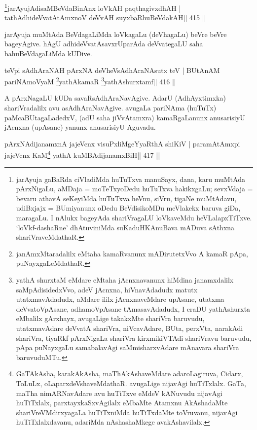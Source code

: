 \begin{shl}
\footnote{jarAyuja gaBaRda ciVladiMda huTuTxva manuSayx, dana, karu muMtAda pArxNigaLu, aMDaja = moTeTxyoDedu huTuTxva hakikxgaLu;  sevxVdaja = bevaru athavA seKeyiMda huTuTxva heVnu, siVru, tigaNe  muMtAdavu, udiBxjajx = BUmiyanunx oDedu BeVdisikoMDu meVlakekx baruva  giDa, maragaLu. I nAlukx bageyAda shariVragaLU loVkaveMdu heVLalapxTiTxve. `loVkf-dashaRne' dhAtuviniMda suKaduHKAnuBava mADuva sAthxna shariVraveMdathaR.}jarAyujAdisaMBeVdaBinAnx loVkAH paqthagivxdhAH |
tathA\s dhideVvatAtAmxnoV deVvAH suyxbaRhuBeVdakAH\hfill || 415 ||
\end{shl}

\begin{artha}
jarAyuja muMtAda BeVdagaLiMda loVkagaLu (deVhagaLu) beVre beVre  bageyAgive. hAgU adhideVvatAsavxrUparAda deVvategaLU saha bahuBeVdagaLiMda kUDive.
\end{artha}

\begin{shl}
teV\s pi sAdhAraNAH pArxNA deVheV\s sAdhAraNAsutx teV |
BUtAnAM pariNAmoV\s yaM \footnote{janAmxMtaradalilx eMtaha kamaRvanunx mADirutetxVvo A  kamaR pApa, puNayxgaLeMdathaR.}yathAkamaR \footnote{yathA shurxtaM eMdare eMtaha jAcnxnavanunx hiMdina  janamxdalilx saMpAdisidedxVvo, adeV jAcnxna, hiVnavAdadudx matutx utatxmavAdadudx, aMdare ililx jAcnxnaveMdare upAsane, utatxma deVvatoVpAsane, adhamoVpAsane tAmasavAdadudx, I eraDU yathAshurxta eMbalilx gArxhayx, avugaLige takakxMte shariVra baruvudu, utatxmavAdare deVvatA shariVra, niVcavAdare, BUta, perxVta, narakAdi shariVra, tiyaRkf pArxNigaLa shariVra kirxmikiVTAdi shariVravu baruvudu, pApa puNayxgaLu samabalavAgi saMmisharxvAdare mAnavara shariVra baruvuduMTu.}yathAshurxtamf\hfill || 416 ||
\end{shl}

\begin{artha}
A pArxNagaLU kUDa savaRsAdhAraNavAgive. AdarU (AdhAyxtimxka) shariVradalilx avu asAdhAraNavAgive. avugaLa pariNAma (huTuTx) paMcaBUtagaLadedxV, (adU saha jiVvAtamxra) kamaRgaLanunx anusarisiyU jAcnxna (upAsane) yanunx anusarisiyU Aguvadu.
\end{artha}

\begin{shl}
pArxNAdijanamxnA jajeVcnx visuPxliMgeYyaRthA shiKiV |
paramAtAmx\s pi jajeVcnx KaM\footnote{GaTAkAsha, karakAkAsha, maThAkAshaveMdare  adaroLagiruva, Cidarx, ToLuLx, oLaparxdeVshaveMdathaR. avugaLige nijavAgi huTiTxlalx. GaTa, maTha nimARNavAdare avu huTiTxve eMdeV kANuvudu nijavAgi huTiTxlalx, parxtayxkaSxvAgilalx eMbaMte Atamxnu AkAshadaMte shariVreVMdirxyagaLa huTiTxniMda huTiTxdaMte toVruvanu, nijavAgi huTiTxlalxdavanu, adariMda nAshashaMkege avakAshavilalx.} yathA kuMBAdijanamxBiH\hfill || 417 ||
\end{shl}


